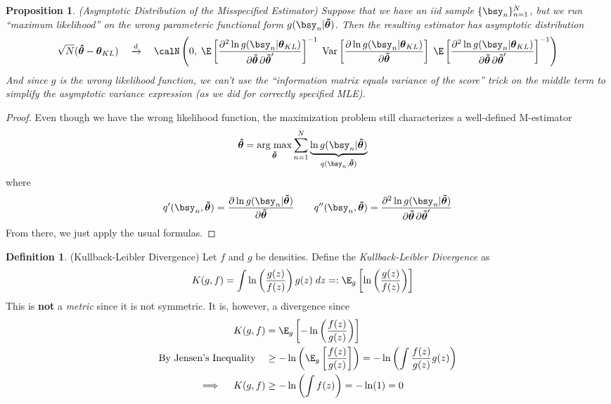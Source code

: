 \documentclass[12pt]{article}
\theoremstyle{plain}
\newtheorem{prop}[thm]{Proposition}
\theoremstyle{definition}
\newtheorem{defn}[thm]{Definition}
\theoremstyle{remark}
\newcommand{\bstheta}{\boldsymbol{\theta}}
\newcommand{\bshattheta}{\boldsymbol{\hat{\theta}}}
\newcommand{\bstildetheta}{\boldsymbol{\tilde{\theta}}}
\DeclareMathOperator*{\argmax}{arg\;max}
\newcommand{\Var}{\operatorname{Var}}
\newcommand{\dto}{\xrightarrow{d}}
\newcommand{\sumnN}{\sum^N_{n=1}}
\newcommand{\nN}{_{n=1}^N}
\begin{document}
\begin{prop}(Asymptotic Distribution of the Misspecified Estimator)
Suppose that we have an iid sample $\{\bsy_n\}\nN$, but we run ``maximum
likelihood'' on the \emph{wrong} parameteric functional form
$g(\bsy_n|\bstildetheta)$. Then the resulting estimator has asymptotic
distribution
\begin{align*}
  \sqrt{N}(\bshattheta-\bstheta_{KL})
  \quad\dto\quad
  \calN\left(0,\;
  \E\left[
  \frac{\partial^2 \ln g(\bsy_n|\bstheta_{KL})}{%
    \partial\bstildetheta\,\partial\bstildetheta'}
  \right]^{-1}
  \;
  \Var\left[
    \frac{\partial \ln g(\bsy_n|\bstheta_{KL})}{\partial \bstildetheta}
  \right]
  \;
  \E\left[
  \frac{\partial^2 \ln g(\bsy_n|\bstheta_{KL})}{%
    \partial\bstildetheta\,\partial\bstildetheta'}
  \right]^{-1}
  \right)
\end{align*}
And since $g$ is the wrong likelihood function, we can't use the
``information matrix equals variance of the score'' trick on the middle
term to simplify the asymptotic variance expression (as we did for
correctly specified MLE).
\end{prop}
\begin{proof}
Even though we have the wrong likelihood function, the maximization
problem still characterizes a well-defined M-estimator
\begin{align*}
  \bshattheta
  &=
  \argmax_{\bstildetheta}
  \sumnN
  \underbrace{%
  \ln g(\bsy_{n}|\bstildetheta)
  }_{q(\bsy_n,\bstildetheta)}
\end{align*}
where
\begin{align*}
  q'(\bsy_n,\bstildetheta)
  =
  \frac{\partial \ln g(\bsy_n|\bstildetheta)}{\partial \bstildetheta}
  \qquad
  q''(\bsy_n,\bstildetheta)
  =
  \frac{\partial^2 \ln g(\bsy_n|\bstildetheta)}{%
    \partial\bstildetheta\,\partial\bstildetheta'}
\end{align*}
From there, we just apply the usual formulas.
\end{proof}


\clearpage
\begin{defn}(Kullback-Leibler Divergence)
Let $f$ and $g$ be densities. Define the
\emph{Kullback-Leibler Divergence} as
\begin{align*}
  K(g,f)
  &= \int \ln\left(\frac{g(z)}{f(z)} \right) g(z)\;dz
  =: \E_g\left[
  \ln\left(\frac{g(z)}{f(z)} \right)
  \right]
\end{align*}
This is \textbf{not} a \emph{metric} since it is not symmetric. It is,
however, a divergence since
\begin{align*}
  K(g,f)
  &= \E_g\left[
  -\ln\left(\frac{f(z)}{g(z)}\right)
  \right] \\
  \text{By Jensen's Inequality}\quad
  &\geq
  -\ln\left(
  \E_g\left[
  \frac{f(z)}{g(z)}
  \right]  \right)
  =
  -\ln\left(
  \int
  \frac{f(z)}{g(z)}
  g(z)
  \right)
  \\
  \implies\quad
  K(g,f)
  &\geq
  -\ln\left(
  \int
  f(z)
  \right)
  = -\ln(1) = 0
\end{align*}
\end{defn}
\end{document}
